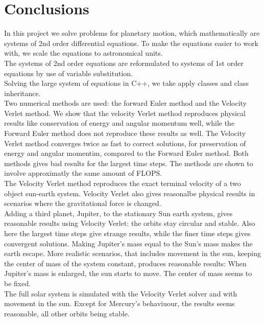 \documentclass{article}
\begin{document}
\section{Conclusions}
In this project we solve problems for planetary motion, which mathematically are systems of 2nd order differential equations. To make the equations easier to work with, we scale the equations to astronomical units.\\

The systems of 2nd order equations are reformulated to systems of 1st order equations by use of variable substitution. \\

Solving the large system of equations in C++, we take apply classes and class inheritance.\\

Two numerical methods are used: the forward Euler method and the Velocity Verlet method. We show that the velocity Verlet method reproduces physical results like conservation of energy and angular momentum well, while the Forward Euler method does not reproduce these results as well. The Velocity Verlet method converges twice as fast to correct solutions, for preservation of energy and angular momentim, compared to the Forward Euler method. Both methods gives bad results for the largest time steps. The methods are shown to involve approximatly the same amount of FLOPS.\\

The Velocity Verlet method reproduces the exact terminal velocity of a two object sun-earth system. Velocity Verlet also gives reasonalbe physical results in scenarios where the gravitational force is changed. \\

Adding a third planet, Jupiter, to the stationary Sun earth system, gives reasonable results using Velocity Verlet: the orbits stay circular and stable. Also here the largest time steps give strange results, while the finer time steps gives convergent solutions. Making Jupiter's mass equal to the Sun's mass makes the earth escape. More realistic scenarios, that includes movement in the sun, keeping the center of mass of the system constant, produces reasonable results: When Jupiter's mass is enlarged, the sun starts to move. The center of mass seems to be fixed.\\

The full solar system is simulated with the Velocity Verlet solver and with movement in the sun. Except for Mercury's behaviuour, the results seems reasonable, all other orbits being stable.\\
\end{document}
